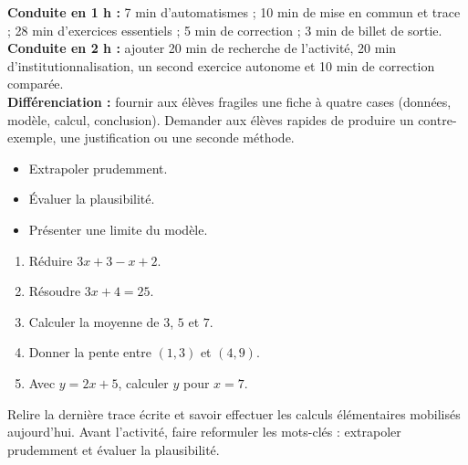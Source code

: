 \ifmxteacher
\begin{method}
\textbf{Conduite en 1 h :} 7 min d'automatismes ; 10 min de mise en commun et trace ; 28 min d'exercices essentiels ; 5 min de correction ; 3 min de billet de sortie.\\
\textbf{Conduite en 2 h :} ajouter 20 min de recherche de l'activité, 20 min d'institutionnalisation, un second exercice autonome et 10 min de correction comparée.\\
\textbf{Différenciation :} fournir aux élèves fragiles une fiche à quatre cases (données, modèle, calcul, conclusion). Demander aux élèves rapides de produire un contre-exemple, une justification ou une seconde méthode.
\end{method}
\fi
{}
\begin{objectives}\begin{itemize}\item Extrapoler prudemment.\item Évaluer la plausibilité.\item Présenter une limite du modèle.\end{itemize}\end{objectives}
\begin{fluency}\begin{enumerate}\item Réduire $3x+3-x+2$. \item Résoudre $3x+4=25$. \item Calculer la moyenne de $3$, $5$ et $7$. \item Donner la pente entre $(1,3)$ et $(4,9)$. \item Avec $y=2x+5$, calculer $y$ pour $x=7$. \end{enumerate}\end{fluency}
\begin{prerequisites}Relire la dernière trace écrite et savoir effectuer les calculs élémentaires mobilisés aujourd'hui. Avant l'activité, faire reformuler les mots-clés : extrapoler prudemment et évaluer la plausibilité.\end{prerequisites}

